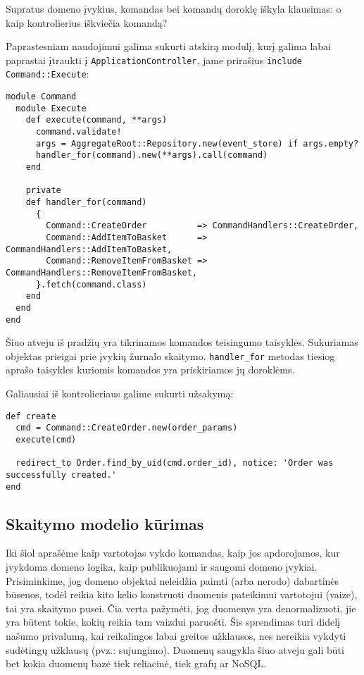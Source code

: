 Supratus domeno įvykius, komandas bei komandų doroklę iškyla klausimas: o kaip kontrolierius iškviečia komandą?

Paprastesniam naudojimui galima sukurti atskirą modulį, kurį galima labai paprastai įtraukti į \lstinline|ApplicationController|, jame prirašius \lstinline|include Command::Execute|:

\begin{lstlisting}
module Command
  module Execute
    def execute(command, **args)
      command.validate!
      args = AggregateRoot::Repository.new(event_store) if args.empty?
      handler_for(command).new(**args).call(command)
    end

    private
    def handler_for(command)
      {
        Command::CreateOrder          => CommandHandlers::CreateOrder,
        Command::AddItemToBasket      => CommandHandlers::AddItemToBasket,
        Command::RemoveItemFromBasket => CommandHandlers::RemoveItemFromBasket,
      }.fetch(command.class)
    end
  end
end
\end{lstlisting}

Šiuo atveju iš pradžių yra tikrinamos komandos teisingumo taisyklės. Sukuriamas objektas prieigai prie įvykių žurnalo skaitymo. \lstinline|handler_for| metodas tiesiog aprašo taisykles kuriomis komandos yra priskiriamos jų doroklėms.

Galiausiai iš kontrolieriaus galime sukurti užsakymą:

\begin{lstlisting}
def create
  cmd = Command::CreateOrder.new(order_params)
  execute(cmd)

  redirect_to Order.find_by_uid(cmd.order_id), notice: 'Order was successfully created.'
end
\end{lstlisting}

\subsection{Skaitymo modelio kūrimas}

Iki šiol aprašėme kaip vartotojas vykdo komandas, kaip jos apdorojamos, kur įvykdoma domeno logika, kaip publikuojami ir saugomi domeno įvykiai. Prisiminkime, jog domeno objektai neleidžia paimti (arba nerodo) dabartinės būsenos, todėl reikia kito kelio konstruoti duomenis pateikimui vartotojui (vaize), tai yra skaitymo pusei. Čia verta pažymėti, jog duomenys yra denormalizuoti, jie yra būtent tokie, kokių reikia tam vaizdui paruošti. Šis sprendimas turi didelį našumo privalumą, kai reikalingos labai greitos užklausos, nes nereikia vykdyti sudėtingų užklausų (pvz.: sujungimo). Duomenų saugykla šiuo atveju gali būti bet kokia duomenų bazė tiek reliacinė, tiek grafų ar NoSQL.

